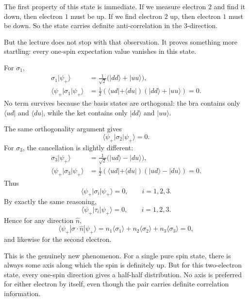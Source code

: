 The first property of this state is immediate. If we measure electron \(2\) and find it down, then electron \(1\) must be up. If we find electron \(2\) up, then electron \(1\) must be down. So the state carries definite anti-correlation in the \(3\)-direction.

But the lecture does not stop with that observation. It proves something more startling: every one-spin expectation value vanishes in this state.

For \(\sigma_1\),
\begin{align}
\sigma_1|\psi_+\rangle
&=
\frac{1}{\sqrt2}\bigl(|dd\rangle+|uu\rangle\bigr), \\
\langle \psi_+|\sigma_1|\psi_+\rangle
&=
\frac{1}{2}
(\langle ud|+\langle du|)(|dd\rangle+|uu\rangle)
=0.
\end{align}
No term survives because the basis states are orthogonal: the bra contains only \(\langle ud|\) and \(\langle du|\), while the ket contains only \(|dd\rangle\) and \(|uu\rangle\).

The same orthogonality argument gives
\begin{equation}
\langle \psi_+|\sigma_2|\psi_+\rangle=0.
\end{equation}
For \(\sigma_3\), the cancellation is slightly different:
\begin{align}
\sigma_3|\psi_+\rangle
&=
\frac{1}{\sqrt2}\bigl(|ud\rangle-|du\rangle\bigr), \\
\langle \psi_+|\sigma_3|\psi_+\rangle
&=
\frac{1}{2}
(\langle ud|+\langle du|)(|ud\rangle-|du\rangle)
=0.
\end{align}
Thus
\begin{equation}
\langle \psi_+|\sigma_i|\psi_+\rangle=0,
\qquad i=1,2,3.
\end{equation}
By exactly the same reasoning,
\begin{equation}
\langle \psi_+|\tau_i|\psi_+\rangle=0,
\qquad i=1,2,3.
\end{equation}
Hence for any direction \(\hat n\),
\begin{equation}
\langle \psi_+|\sigma\cdot\hat n|\psi_+\rangle
=
n_1\langle \sigma_1\rangle
+
n_2\langle \sigma_2\rangle
+
n_3\langle \sigma_3\rangle
=
0,
\end{equation}
and likewise for the second electron.

This is the genuinely new phenomenon. For a single pure spin state, there is always some axis along which the spin is definitely up. But for this two-electron state, every one-spin direction gives a half-half distribution. No axis is preferred for either electron by itself, even though the pair carries definite correlation information.

